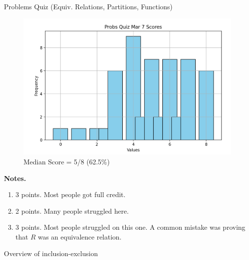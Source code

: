 \documentclass[10pt]{beamer}
\begin{document}
\begin{frame}{Problems Quiz (Equiv. Relations, Partitions, Functions)}
\footnotesize 
\begin{figure}[ht]
        \centering
        \includegraphics[width=.6\textwidth]{images/reading_quiz_scores}
   		 \caption{Median Score = 5/8 (62.5\%)}
\end{figure}
\vfill 
\textbf{Notes.}  	
\begin{enumerate}
\item  3 points. Most people got full credit.
\item 2 points.  Many people struggled here.
\item 3 points.  Most people struggled on this one. A common mistake was proving that $R$ was an equivalence relation.
\end{enumerate}
\end{frame}




%


\begin{frame}[standout]
Overview of inclusion-exclusion
\end{frame}
\end{document}
